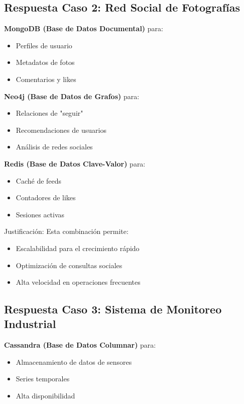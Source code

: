 \documentclass[12pt]{article}
\begin{document}
\subsection{Respuesta Caso 2: Red Social de Fotografías}

\textbf{MongoDB (Base de Datos Documental)} para:
\begin{itemize}
    \item Perfiles de usuario
    \item Metadatos de fotos
    \item Comentarios y likes
\end{itemize}

\textbf{Neo4j (Base de Datos de Grafos)} para:
\begin{itemize}
    \item Relaciones de "seguir"
    \item Recomendaciones de usuarios
    \item Análisis de redes sociales
\end{itemize}

\textbf{Redis (Base de Datos Clave-Valor)} para:
\begin{itemize}
    \item Caché de feeds
    \item Contadores de likes
    \item Sesiones activas
\end{itemize}

Justificación: Esta combinación permite:
\begin{itemize}
    \item Escalabilidad para el crecimiento rápido
    \item Optimización de consultas sociales
    \item Alta velocidad en operaciones frecuentes
\end{itemize}

\subsection{Respuesta Caso 3: Sistema de Monitoreo Industrial}

\textbf{Cassandra (Base de Datos Columnar)} para:
\begin{itemize}
    \item Almacenamiento de datos de sensores
    \item Series temporales
    \item Alta disponibilidad
\end{itemize}
\end{document}
